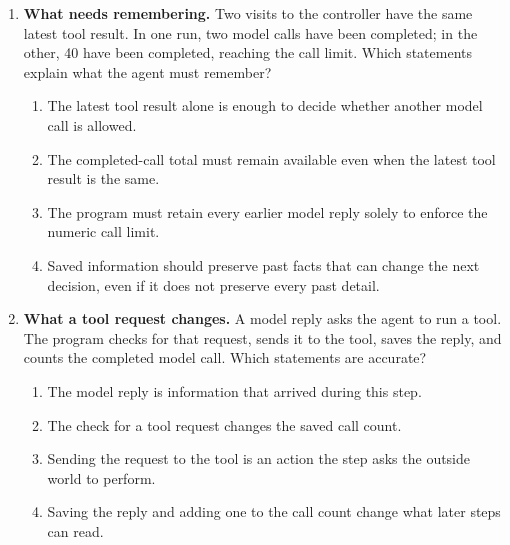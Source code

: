 \begin{enumerate}[start=1,itemsep=0.7\baselineskip]
\item\label{exercise:5} \begin{minipage}[t]{\linewidth}
\textbf{What needs remembering.} Two visits to the controller have the same latest tool result. In one run, two model calls have been completed; in the other, 40 have been completed, reaching the call limit. Which statements explain what the agent must remember?
\begin{enumerate}[label=\textnormal{(\Alph*)},leftmargin=*,itemsep=0pt]
\item The latest tool result alone is enough to decide whether another model call is allowed.
\item The completed-call total must remain available even when the latest tool result is the same.
\item The program must retain every earlier model reply solely to enforce the numeric call limit.
\item Saved information should preserve past facts that can change the next decision, even if it does not preserve every past detail.
\end{enumerate}
\end{minipage}

\item\label{exercise:6} \begin{minipage}[t]{\linewidth}
\textbf{What a tool request changes.} A model reply asks the agent to run a tool. The program checks for that request, sends it to the tool, saves the reply, and counts the completed model call. Which statements are accurate?
\begin{enumerate}[label=\textnormal{(\Alph*)},leftmargin=*,itemsep=0pt]
\item The model reply is information that arrived during this step.
\item The check for a tool request changes the saved call count.
\item Sending the request to the tool is an action the step asks the outside world to perform.
\item Saving the reply and adding one to the call count change what later steps can read.
\end{enumerate}
\end{minipage}


\end{enumerate}
